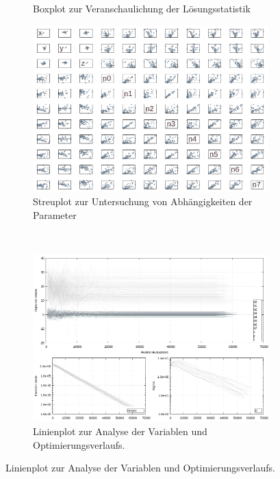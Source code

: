 \begin{landscape}
\begin{figure}[!ht]
\begin{subfigure}[t]{0.45\textheight}
	     	    \caption{Boxplot zur Veranschaulichung der Lösungsstatistik }
	\end{subfigure}
	\qquad
	\begin{subfigure}[t]{0.45\textheight}
			\centering
	   \includegraphics[width=\textwidth]{img/evo/Scatter2089.png}
	   	       \caption{Streuplot zur Untersuchung von Abhängigkeiten der Parameter}
	\end{subfigure}
	\vspace{5mm}
\\
	\centering
	\begin{subfigure}[t]{0.45\textheight}
	     \centering
	     \includegraphics[width=\textwidth]{img/evo/lines4089.png}
	             \caption{Linienplot zur Analyse der Variablen und Optimierungsverlaufs.}

\end{subfigure}
\end{figure}
\end{landscape}

